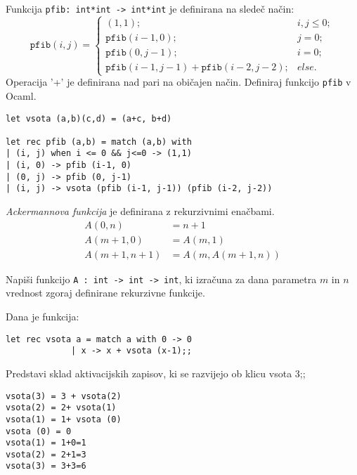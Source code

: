 \begin{ex}
Funkcija \lstinline{pfib: int*int -> int*int} je definirana na slede\v c na\v cin:
$$
\mathtt{pfib}(i,j)=\begin{cases}
(1,1); & i,j\le0;\\
\mathtt{pfib}(i-1,0); & j=0;\\
\mathtt{pfib}(0,j-1); & i=0;\\
\mathtt{pfib}(i-1,j-1)+\mathtt{pfib}(i-2,j-2); & else.
\end{cases}
$$
Operacija '+' je definirana nad pari na obi\v cajen na\v cin. Definiraj funkcijo \lstinline{pfib} v Ocaml.

\begin{sol}
\begin{lstlisting}
let vsota (a,b)(c,d) = (a+c, b+d)

let rec pfib (a,b) = match (a,b) with
| (i, j) when i <= 0 && j<=0 -> (1,1)
| (i, 0) -> pfib (i-1, 0)
| (0, j) -> pfib (0, j-1)
| (i, j) -> vsota (pfib (i-1, j-1)) (pfib (i-2, j-2))    
\end{lstlisting}
\end{sol}



\end{ex}
\begin{ex}
\emph{Ackermannova funkcija} je definirana z rekurzivnimi ena\v cbami.
\begin{align*}
A(0, n) &= n+1 \\
A(m + 1, 0) &= A(m, 1) \\ 
A(m + 1, n + 1) &= A(m, A(m + 1, n)) 
\end{align*}

Napi\v si funkcijo \lstinline{A : int -> int -> int}, ki izra\v cuna za dana parametra $m$ in $n$ vrednost zgoraj definirane rekurzivne funkcije.
\end{ex}
\begin{ex}
Dana je funkcija:
\begin{lstlisting}
let rec vsota a = match a with 0 -> 0 
             | x -> x + vsota (x-1);;
\end{lstlisting}

Predstavi sklad aktivacijskih zapisov, ki se razvijejo ob klicu vsota 3;;

\begin{sol}
\begin{lstlisting}
vsota(3) = 3 + vsota(2)
vsota(2) = 2+ vsota(1)
vsota(1) = 1+ vsota (0)
vsota (0) = 0
vsota(1) = 1+0=1
vsota(2) = 2+1=3
vsota(3) = 3+3=6
\end{lstlisting}
\end{sol}

\end{ex}
